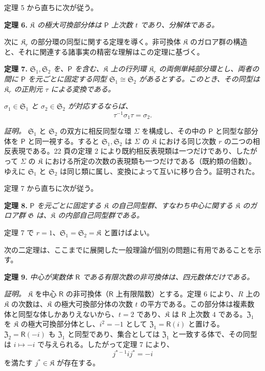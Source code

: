 定理 5 から直ちに次が従う。

\textbf{定理 6.} \emph{$\mathfrak K$ の極大可換部分体は $\mathsf P$ 上次数 $t$ であり、分解体である。}

次に $\mathfrak K_r$ の部分環の同型に関する定理を導く。非可換体 $\mathfrak K$ のガロア群の構造と、それに関連する諸事実の精密な理解はこの定理に基づく。

\textbf{定理 7.} \emph{$\mathfrak S_1,\mathfrak S_2$ を、$\mathsf P$ を含む、$\mathfrak K$ 上の行列環 $\mathfrak K_r$ の両側単純部分環とし、両者の間に $\mathsf P$ を元ごとに固定する同型 $\mathfrak S_1\cong\mathfrak S_2$ があるとする。このとき、その同型は $\mathfrak K_r$ の正則元 $\tau$ による変換である。}

\emph{$\sigma_1\in\mathfrak S_1$ と $\sigma_2\in\mathfrak S_2$ が対応するならば、}
\[
\tau^{-1}\sigma_1\tau=\sigma_2.
\]

\emph{証明。} $\mathfrak S_1$ と $\mathfrak S_2$ の双方に相反同型な環 $\Sigma$ を構成し、その中の $\mathsf P$ と同型な部分体を $\mathsf P$ と同一視する。すると $\mathfrak S_1,\mathfrak S_2$ は $\Sigma$ の $\mathfrak K$ における同じ次数 $r$ の二つの相反表現である。22 頁の定理 2 により既約相反表現類は一つだけであり、したがって $\Sigma$ の $\mathfrak K$ における所定の次数の表現類も一つだけである（既約類の倍数）。ゆえに $\mathfrak S_1$ と $\mathfrak S_2$ は同じ類に属し、変換によって互いに移り合う。証明された。

定理 7 から直ちに次が従う。

\textbf{定理 8.} \emph{$\mathsf P$ を元ごとに固定する $\mathfrak K$ の自己同型群、すなわち中心に関する $\mathfrak K$ のガロア群 $\mathfrak G$ は、$\mathfrak K$ の内部自己同型群である。}

定理 7 で $r=1$、$\mathfrak S_1=\mathfrak S_2=\mathfrak K$ と置けばよい。

次の二定理は、ここまでに展開した一般理論が個別の問題に有用であることを示す。

\textbf{定理 9.} \emph{中心が実数体 $\mathsf{R}$ である有限次数の非可換体は、四元数体だけである。}

\emph{証明。} $\mathfrak K$ を中心 $\mathsf{R}$ の非可換体（$\mathsf{R}$ 上有限階数）とする。定理 6 により、$R$ 上の $\mathfrak K$ の次数は、$\mathfrak K$ の極大可換部分体の次数 $t$ の平方である。この部分体は複素数体と同型な体しかありえないから、$t=2$ であり、$\mathfrak K$ は $\mathsf{R}$ 上次数 $4$ である。$\mathfrak Z_1$ を $\mathfrak K$ の極大可換部分体とし、$i^2=-1$ として $\mathfrak Z_1=\mathsf{R}(i)$ と置ける。$\mathfrak Z_2=\mathsf{R}(-i)$ も $\mathfrak Z_1$ と同型であり、集合としては $\mathfrak Z_1$ と一致する体で、その同型は $i\mapsto-i$ で与えられる。したがって定理 7 により、
\[
j^{*-1}ij^*=-i
\]
を満たす $j^*\in\mathfrak K$ が存在する。

